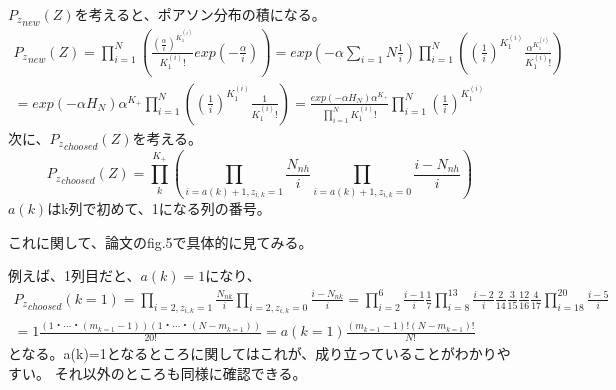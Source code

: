 ﻿\documentclass{jsarticle}
\begin{document}
${P_z}_{new}(Z)$を考えると、ポアソン分布の積になる。
\begin{equation}
\begin{split}
\label{znew}
{P_z}_{new}(Z) = \prod_{i=1}^N (\frac{(\frac{\alpha}{i})^{K_1^{(i)}}}{K_1^{(i)}!}exp(-\frac{\alpha}{i}))
= exp(-\alpha \sum_{i=1}{N}\frac{1}{i})\prod_{i=1}^N ((\frac{1}{i})^{K_1^{(i)}} \frac{\alpha^{K_1^{(i)}}}{K_1^{(i)}!})\\
= exp(-\alpha H_N)\alpha^{K_+}\prod_{i=1}^N ((\frac{1}{i})^{K_1^{(i)}} \frac{1}{K_1^{(i)}!})
= \frac{exp(-\alpha H_N)\alpha^{K_+}}{\prod_{i=1}^N K_1^{(i)}!} \prod_{i=1}^N (\frac{1}{i})^{K_1^{(i)}}
\end{split}
\end{equation}
次に、${P_z}_{choosed}(Z)$を考える。
\begin{equation}
\label{zchoosedTmp}
{P_z}_{choosed}(Z) = \prod_{k}^{K_+} (\prod_{i = a(k)+1, z_{i,k} = 1} \frac{N_{nh}}{i} \prod_{i = a(k)+1, z_{i,k} = 0} \frac{i - N_{nh}}{i})
\end{equation}
$a(k)$はk列で初めて、1になる列の番号。

これに関して、論文のfig.5で具体的に見てみる。

例えば、1列目だと、$a(k) = 1$になり、
\begin{equation}
\begin{split}
{P_z}_{choosed}(k=1) = \prod_{i = 2, z_{i,k} = 1} \frac{N_{nk}}{i} \prod_{i = 2, z_{i,k} = 0} \frac{i - N_{nk}}{i} = \prod_{i=2}^6 \frac{i - 1}{i}\frac{1}{7}\prod_{i=8}^{13} \frac{i - 2}{i}\frac{2}{14}\frac{3}{15}\frac{12}{16}\frac{4}{17}\prod_{i=18}^{20} \frac{i - 5}{i}\\
=1 \frac{(1・\cdots・(m_{k=1}-1))(1・\cdots・(N - m_{k=1}))}{20!}
=a(k=1) \frac{(m_{k=1}-1)!(N - m_{k=1})!}{N!}
\end{split}
\end{equation}
となる。a(k)=1となるところに関してはこれが、成り立っていることがわかりやすい。
それ以外のところも同様に確認できる。
\end{document}
